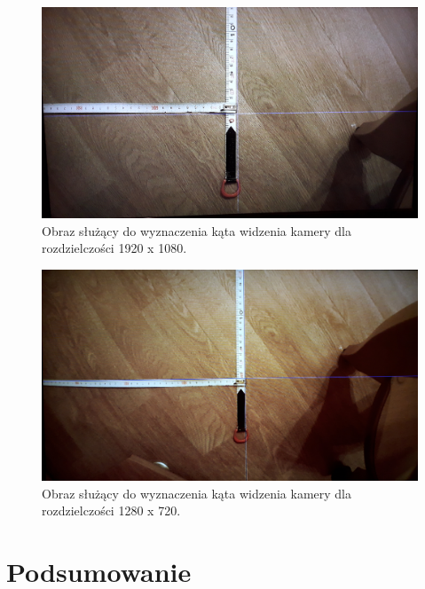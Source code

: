 \begin{figure}[h]
	\centering
	\includegraphics[width=\textwidth]{1080p.jpg}
	\caption{Obraz służący do wyznaczenia kąta widzenia kamery dla rozdzielczości 1920 x 1080.}
	\label{fig:1080p}
\end{figure}
\begin{figure}[h]
	\centering
	\includegraphics[width=\textwidth]{720p.jpg}
	\caption{Obraz służący do wyznaczenia kąta widzenia kamery dla rozdzielczości 1280 x 720.}
	\label{fig:720p}
\end{figure}



\section{Podsumowanie}






